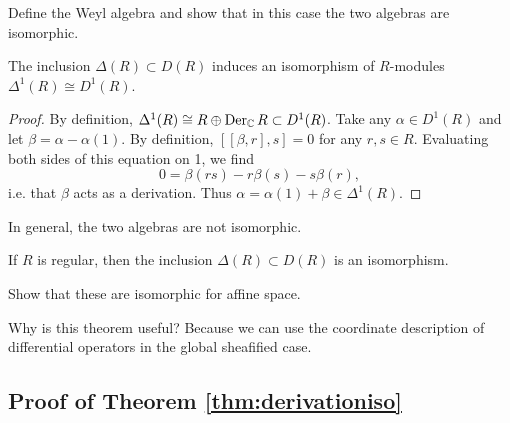 \begin{example}
    Define the Weyl algebra and show that in this case the two algebras are
    isomorphic.
\end{example}

\begin{lemma}
    The inclusion $\Delta(R)\subset D(R)$ induces an isomorphism of
    $R$-modules $\Delta^1(R)\cong D^1(R)$.
    \label{lemma:firstorder}
\end{lemma}
\begin{proof}
    By definition, $\Delta^1(R)\cong R\oplus\operatorname{Der}_{\mathbb{C}} R\subset D^1(R)$. Take any $\alpha\in D^1(R)$
    and let $\beta=\alpha-\alpha(1)$. By definition, $[ [\beta,r],s]=0$ for any $r,s\in R$.
    Evaluating both sides of this equation on 1, we find
    \[0 = \beta(rs)-r\beta(s)-s\beta(r),\]
    i.e. that $\beta$ acts as a derivation. Thus $\alpha=\alpha(1)+\beta\in\Delta^1(R)$.
\end{proof}

\begin{example}
    In general, the two algebras are not isomorphic.
\end{example}

\begin{theorem}
    If $R$ is regular, then the inclusion $\Delta(R)\subset D(R)$ is an isomorphism.
    \label{thm:derivationiso}
\end{theorem}

\begin{example}
    Show that these are isomorphic for affine space.
\end{example}

Why is this theorem useful? Because we can use the coordinate description of differential
operators in the global sheafified case.

\subsection{Proof of Theorem \ref{thm:derivationiso}}

